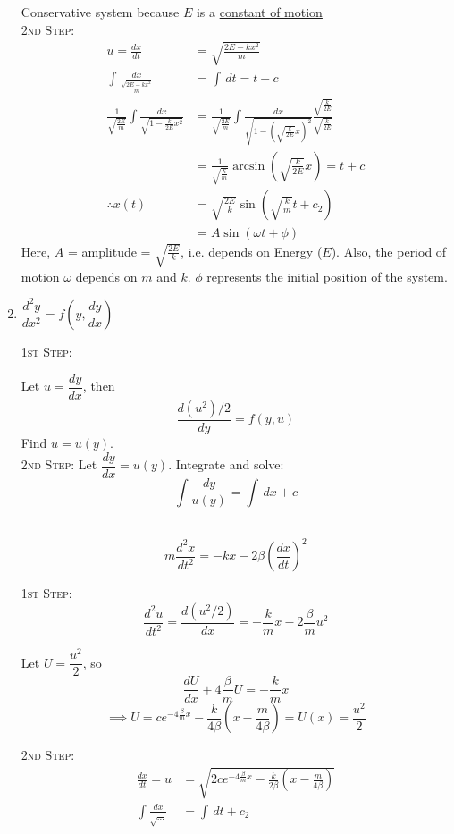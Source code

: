 \documentclass[10pt]{scrartcl}
\begin{document}
\begin{enumerate}[(1)]
\begin{example}
Conservative system because $E$ is a \href{https://en.wikipedia.org/wiki/Constant_of_motion}{constant of motion}\\
\textsc{2nd Step:}
\[
\begin{aligned}
  u = \frac{dx}{dt} &= \sqrt{\frac{2E -kx^2}{m}}\\
  \int \frac{dx}{\frac{\sqrt{2E-kx^2}}{m}} &= \int \,dt = t +c\\
  \frac{1}{\sqrt{\frac{2E}{m}}}\int \frac{dx}{\sqrt{1-\frac{k}{2E}x^2}} &=  \frac{1}{\sqrt{\frac{2E}{m}}} \int \frac{dx}{\sqrt{1-\left(\sqrt{\frac{k}{2E}}x\right)^2}}\frac{\sqrt{\frac{k}{2E}}}{\sqrt{\frac{k}{2E}}}\\
  &= \frac{1}{\sqrt{\frac{k}{m}}}\arcsin\left(\sqrt{\frac{k}{2E}}x\right) = t+c\\
  \therefore x(t) &= \sqrt{\frac{2E}{k}}\sin\left(\sqrt{\frac{k}{m}}t + c_2\right)\\
  &= A\sin(\omega t + \phi)
\end{aligned}
\]
Here, $A$ = amplitude = $\sqrt{\frac{2E}{k}}$, i.e. depends on Energy ($E$). Also, the period of motion $\omega$ depends on $m$ and $k$. $\phi$ represents the initial position of the system.
\end{example}

\item $\dfrac{d^2y}{dx^2} = f\left(y,\dfrac{dy}{dx}\right)$

\textsc{1st Step:}

Let $u = \dfrac{dy}{dx}$, then 
\[\frac{d(u^2)/2}{dy} = f(y,u)\]
Find $u = u(y)$.\\

\textsc{2nd Step:}
Let $\dfrac{dy}{dx} = u(y)$. Integrate and solve:
\[\int \frac{dy}{u(y)} = \int\,dx + c\]~

\begin{example}[Spring]
	\[m\frac{d^2x}{dt^2} = -kx - 2\beta\left(\frac{dx}{dt}\right)^2\]
	
	\textsc{1st Step:}
	\[\frac{d^2u}{dt^2} = \frac{d(u^2/2)}{dx} = -\frac{k}{m}x - 2\frac{\beta}{m}u^2\]
	
	Let $U = \dfrac{u^2}{2}$, so 
	\[\frac{dU}{dx} + 4\frac{\beta}{m}U = -\frac{k}{m}x\]
	\[\implies U = ce^{-4\frac{\beta}{m}x} - \frac{k}{4\beta}\left(x - \frac{m}{4\beta}\right) = U(x) = \frac{u^2}{2}\]

	\textsc{2nd Step:} 
	\[
\begin{aligned}
  \frac{dx}{dt} = u &= \sqrt{2ce^{-4\frac{\beta}{m}x} - \frac{k}{2\beta}\left(x-\frac{m}{4\beta}\right)}\\
  \int \frac{dx}{\sqrt{\dots}} &= \int \,dt + c_2
\end{aligned}
\]
\end{example}
\end{enumerate}
\end{document}
